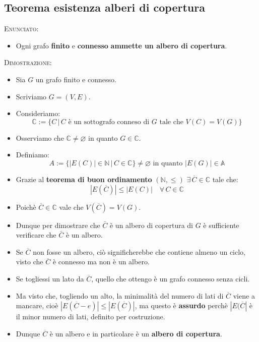 \documentclass[10pt]{article}
\begin{document}
\subsection{Teorema esistenza alberi di copertura}
\textsc{Enunciato:}
\begin{itemize}
\item
Ogni grafo \textbf{finito} e \textbf{connesso} \textbf{ammette un albero di copertura}.
\end{itemize}
\textsc{Dimostrazione:}
\begin{itemize}
\item
Sia $G$ un grafo finito e connesso.
\item
Scriviamo $G=(V,E)$.
\item
Consideriamo:
$$\mathbb{C} := \{C\,|\,C \textrm{ è un sottografo conneso di } G \textrm{ tale che } V(C) = V(G) \}$$
\item
Osserviamo che $\mathbb{C} \neq \varnothing$ in quanto $G \in \mathbb{C}$.
\item
Definiamo:
$$A := \{|E(C)| \in \mathbb{N} \,|\, C \in \mathbb{C}\} \neq \varnothing \textrm{ in quanto } |E(G)| \in \mathbb{A} $$
\item
Grazie al \textbf{teorema di buon ordinamento} $(\mathbb{N},\leq)\,\, \exists \, \overline{C} \in \mathbb{C}$ tale che:
$$|E(\overline{C})| \leq |E(C)| \quad \forall \, C \in \mathbb{C}$$ 
\item
Poichè $\overline{C} \in \mathbb{C}$ vale che $V(\overline{C}) = V(G)$.
\item
Dunque per dimostrare che $\bar{C}$ è un albero di copertura di $G$ è sufficiente verificare che $\bar{C}$ è un albero.
\item
Se $\overline{C}$ non fosse un albero, ciò significherebbe che contiene almeno un ciclo, visto che $\overline{C}$ è connesso ma non è un albero.
\item
Se togliessi un lato da $\overline{C}$, quello che ottengo è un grafo connesso senza cicli.
\item
Ma visto che, togliendo un alto, la minimalità del numero di lati di $\overline{C}$ viene a mancare, cioè $|E(\overline{C}-e)| \leq |E(\overline{C})|$, ma questo è \textbf{assurdo} perchè $|E(\overline{C}|$ è il minor numero di lati, definito per costruzione.
\item
Dunque $\overline{C}$ è un albero e in particolare è un \textbf{albero di copertura}.
\end{itemize}
\end{document}
